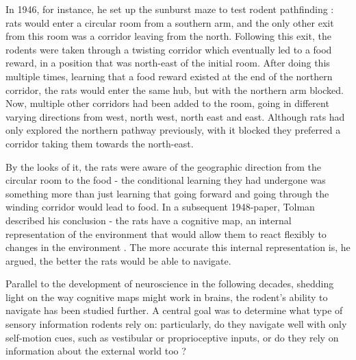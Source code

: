 \documentclass{article}
\begin{document}
    In 1946, for instance, he set up the sunburst maze to test rodent pathfinding \parencite{Tolman1946}: rats would enter a circular room from a southern arm, and the only other exit from this room was a corridor leaving from the north. Following this exit, the rodents were taken through a twisting corridor which eventually led to a food reward, in a position that was north-east of the initial room. After doing this multiple times, learning that a food reward existed at the end of the northern corridor, the rats would enter the same hub, but with the northern arm blocked. Now, multiple other corridors had been added to the room, going in different varying directions from west, north west, north east and east. Although rats had only explored the northern pathway previously, with it blocked they preferred a corridor taking them towards the north-east. 
    
    By the looks of it, the rats were aware of the geographic direction from the circular room to the food - the conditional learning they had undergone was something more than just learning that going forward and going through the winding corridor would lead to food. In a subsequent 1948-paper, Tolman described his conclusion - the rats have a cognitive map, an internal representation of the environment that would allow them to react flexibly to changes in the environment \parencite{Tolman1948}. The more accurate this internal representation is, he argued, the better the rats would be able to navigate.

    Parallel to the development of neuroscience in the following decades, shedding light on the way cognitive maps might work in brains, the rodent's ability to navigate has been studied further. A central goal was to determine what type of sensory information rodents rely on: particularly, do they navigate well with only self-motion cues, such as vestibular or proprioceptive inputs, or do they rely on information about the external world too \parencite{Dudchenko2010}?
\end{document}
